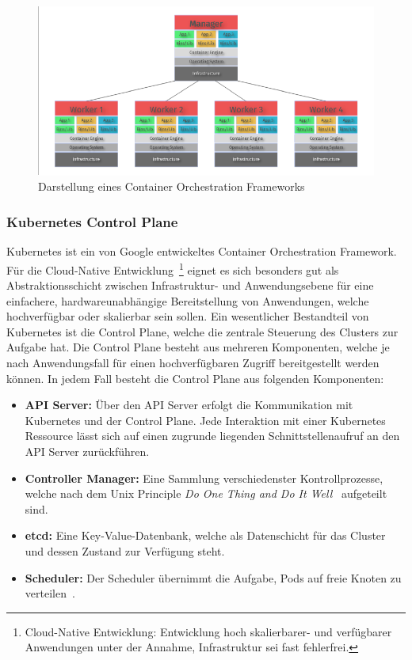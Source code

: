 \begin{figure}[H]
    \centering
    \includegraphics[width=1\textwidth]{img/cof}
    \caption{Darstellung eines Container Orchestration Frameworks \cite{Hick2019}}
    \label{fig:cof}
\end{figure}

\subsubsection{Kubernetes Control Plane} \label{subsec:control-plane}

Kubernetes ist ein von Google entwickeltes Container Orchestration Framework.
Für die Cloud-Native Entwicklung~\footnote{Cloud-Native Entwicklung: Entwicklung hoch skalierbarer- und verfügbarer Anwendungen unter der Annahme, Infrastruktur sei fast fehlerfrei\cite{8125550}.} eignet es sich besonders gut als Abstraktionsschicht zwischen Infrastruktur- und Anwendungsebene für eine einfachere, hardwareunabhängige Bereitstellung von Anwendungen, welche hochverfügbar oder skalierbar sein sollen.
Ein wesentlicher Bestandteil von Kubernetes ist die Control Plane, welche die zentrale Steuerung des Clusters zur Aufgabe hat.
Die Control Plane besteht aus mehreren Komponenten, welche je nach Anwendungsfall für einen hochverfügbaren Zugriff bereitgestellt werden können.
In jedem Fall besteht die Control Plane aus folgenden Komponenten:
\begin{itemize}
    \item \textbf{API Server:} Über den API Server erfolgt die Kommunikation mit Kubernetes und der Control Plane.
    Jede Interaktion mit einer Kubernetes Ressource lässt sich auf einen zugrunde liegenden Schnittstellenaufruf an den API Server zurückführen.
    \item \textbf{Controller Manager:} Eine Sammlung verschiedenster Kontrollprozesse, welche nach dem Unix Principle \emph{Do One Thing and Do It Well}~\cite{gancarz2003linux} aufgeteilt sind.
    \item \textbf{etcd:} Eine Key-Value-Datenbank, welche als Datenschicht für das Cluster und dessen Zustand zur Verfügung steht.
    \item \textbf{Scheduler:} Der Scheduler übernimmt die Aufgabe, Pods auf freie Knoten zu verteilen~\cite{kubernetesscheduler}.
\end{itemize}

